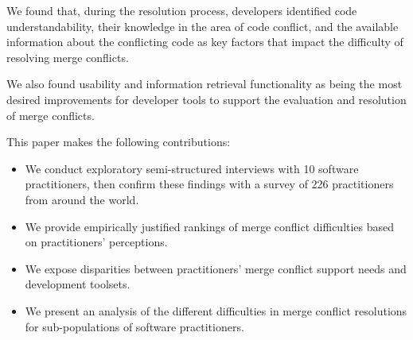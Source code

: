 We found that, during the resolution process, developers identified code understandability, their knowledge in the area of code conflict, and the available information about the conflicting code as key factors that impact the difficulty of resolving merge conflicts.

We also found usability and information retrieval functionality as being the most desired improvements for developer tools to support the evaluation and resolution of merge conflicts.

This paper makes the following contributions:
\begin{itemize}
\item We conduct exploratory semi-structured interviews with 10 software practitioners, then confirm these findings with a survey of 226 practitioners from around the world.
\item We provide empirically justified rankings of merge conflict difficulties based on practitioners' perceptions.
\item We expose disparities between practitioners' merge conflict support needs and development toolsets.
\item We present an analysis of the different difficulties in merge conflict resolutions for sub-populations of software practitioners.
\end{itemize}